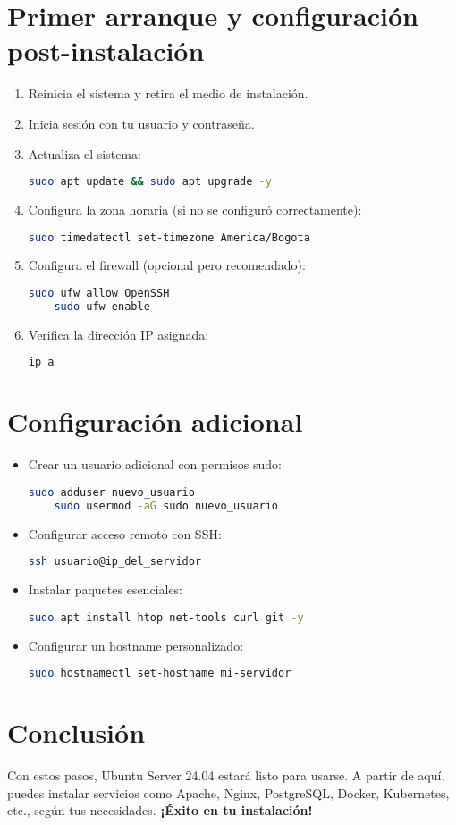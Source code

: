 \documentclass{article}
\begin{document}
\section{Primer arranque y configuración post-instalación}
\begin{enumerate}
    \item Reinicia el sistema y retira el medio de instalación.
    \item Inicia sesión con tu usuario y contraseña.
    \item Actualiza el sistema:
    \begin{lstlisting}[language=bash]
    sudo apt update && sudo apt upgrade -y
    \end{lstlisting}
    \item Configura la zona horaria (si no se configuró correctamente):
    \begin{lstlisting}[language=bash]
    sudo timedatectl set-timezone America/Bogota
    \end{lstlisting}
    \item Configura el firewall (opcional pero recomendado):
    \begin{lstlisting}[language=bash]
    sudo ufw allow OpenSSH
    sudo ufw enable
    \end{lstlisting}
    \item Verifica la dirección IP asignada:
    \begin{lstlisting}[language=bash]
    ip a
    \end{lstlisting}
\end{enumerate}

\section{Configuración adicional}
\begin{itemize}
    \item Crear un usuario adicional con permisos sudo:
    \begin{lstlisting}[language=bash]
    sudo adduser nuevo_usuario
    sudo usermod -aG sudo nuevo_usuario
    \end{lstlisting}
    \item Configurar acceso remoto con SSH:
    \begin{lstlisting}[language=bash]
    ssh usuario@ip_del_servidor
    \end{lstlisting}
    \item Instalar paquetes esenciales:
    \begin{lstlisting}[language=bash]
    sudo apt install htop net-tools curl git -y
    \end{lstlisting}
    \item Configurar un hostname personalizado:
    \begin{lstlisting}[language=bash]
    sudo hostnamectl set-hostname mi-servidor
    \end{lstlisting}
\end{itemize}

\section{Conclusión}
Con estos pasos, Ubuntu Server 24.04 estará listo para usarse. A partir de aquí, puedes instalar servicios como Apache, Nginx, PostgreSQL, Docker, Kubernetes, etc., según tus necesidades. \textbf{¡Éxito en tu instalación!}
\end{document}
